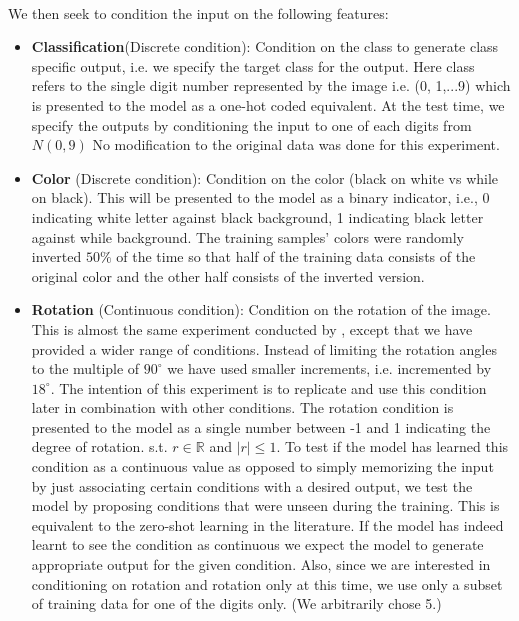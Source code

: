 \documentclass[11pt, letterpaper, oneside]{article}
\begin{document}
\paragraph{}
We then seek to condition the input on the following features:
\begin{itemize}
    \item \textbf{Classification}(Discrete condition): Condition on the class to generate class specific output, i.e. we specify the target class for the output.  \newline
    Here class refers to the single digit number represented by the image i.e. (0, 1,...9) which is presented to the model as a one-hot coded equivalent. At the test time, we specify the outputs by conditioning the input to one of each digits from $N(0,9)$ No modification to the original data was done for this experiment. 
    
    \item \textbf{Color} (Discrete condition): Condition on the color (black on white vs while on black).  \newline
    This will be presented to the model as a binary indicator, i.e., 0 indicating white letter against black background, 1 indicating black letter against while background. The training samples' colors were randomly inverted $50\%$ of the time so that half of the training data consists of the original color and the other half consists of the inverted version. 
    
    \item \textbf{Rotation} (Continuous condition): Condition on the rotation of the image. \newline
    This is almost the same experiment conducted by \cite{chen_self-supervised_2019}, except that we have provided a wider range of conditions. Instead of limiting the rotation angles to the multiple of $90^{\circ}$ we have used smaller increments, i.e. incremented by $18^\circ$. The intention of this experiment is to replicate \cite{chen_self-supervised_2019} and use this condition later in combination with other conditions. The rotation condition is presented to the model as a single number between -1 and 1 indicating the degree of rotation. s.t. $ r \in \mathbb{R}$ and  $|r| \leq 1$. To test if the model has learned this condition as a continuous value as opposed to simply memorizing the input by just associating certain conditions with a desired output, we test the model by proposing conditions that were unseen during the training. This is equivalent to the zero-shot learning in the literature. If the model has indeed learnt to see the condition as continuous we expect the model to generate appropriate output for the given condition. Also, since we are interested in conditioning on rotation and rotation only at this time, we use only a subset of training data for one of the digits only. (We arbitrarily chose 5.)
    

\end{itemize}
\end{document}
